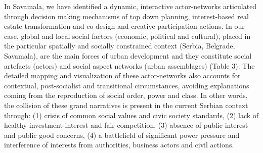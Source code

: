 \documentclass[11pt]{report}
\begin{document}
In Savamala, we have identified a dynamic, interactive actor-networks articulated through decision making mechanisms of top down planning, interest-based real estate transformation and co-design and creative participation actions. In our case, global and local social factors (economic, political and cultural), placed in the particular spatially and socially constrained context (Serbia, Belgrade, Savamala), are the main forces of urban development and they constitute social artefacts (actors) and social aspect networks (urban assemblages) (Table 3). The detailed mapping and visualization of these actor-networks also accounts for contextual, post-socialist and transitional circumstances, avoiding explanations coming from the reproduction of social order, power and class. In other words, the collision of these grand narratives is present in the current Serbian context through: (1) crisis of common social values and civic society standards, (2) lack of healthy investment interest and fair competition, (3) absence of public interest and public good concerns, (4) a battlefield of significant power pressure and interference of interests from authorities, business actors and civil actions.
\end{document}
